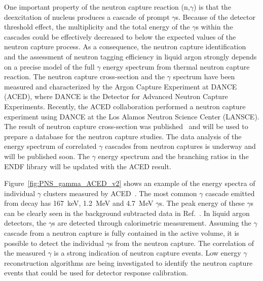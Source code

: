 One important property of the neutron capture reaction (n,$\gamma$) is that the deexcitation of  nucleus produces a cascade of prompt $\gamma$s. Because of the detector threshold effect, the multiplicity and the
total energy of the $\gamma$s within the cascades could be effectively decreased to below the expected values of the neutron capture process. As a consequence, the neutron capture identification and the assessment of neutron tagging efficiency in liquid argon strongly depends on a precise model of the full $\gamma$ energy spectrum from thermal neutron capture reaction. The neutron capture cross-section and the $\gamma$ spectrum have been measured and characterized by the Argon Capture Experiment at DANCE (ACED), where DANCE is the Detector for Advanced Neutron Capture Experiments. Recently, the ACED collaboration performed a neutron capture experiment using DANCE at the Los Alamos Neutron Science Center (LANSCE). The result of neutron capture cross-section was published~\cite{Fischer:2019qfr} and will be used to prepare a database for the neutron capture studies. The data analysis of the energy spectrum of correlated $\gamma$ cascades from neutron captures is underway and will be published soon. 
The $\gamma$ energy spectrum and the branching ratios in the ENDF library will be updated with the ACED result. 

Figure~\ref{fig:PNS_gamma_ACED_v2} shows an example of the energy spectra of individual $\gamma$ clusters measured by ACED~\cite{Fischer:2019qfr}. The most common $\gamma$ cascade emitted from  decay has \SI{167}{keV}, \SI{1.2}{MeV} and \SI{4.7}{MeV} $\gamma$s. The peak energy of these $\gamma$s can be clearly seen in the background subtracted data in Ref.~\cite{Fischer:2019qfr}. In liquid argon detectors, the $\gamma$s are detected through calorimetric measurement. Assuming the $\gamma$ cascade from a neutron capture is fully contained in the active volume, it is possible to detect the individual $\gamma$s from the neutron capture. The correlation of the measured $\gamma$ is a strong indication of neutron capture events. Low energy $\gamma$ reconstruction algorithms are being investigated to identify the neutron capture events that could be used for detector response calibration. 

